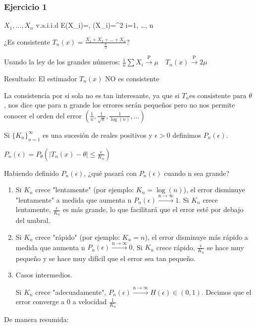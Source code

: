\documentclass{article}
\begin{document}
\subsubsection*{Ejercicio 1}
\(X_1, \dots, X_n \) v.a.i.i.d \quad E(X_i)=\mu, (X_i)=\sigma^2 \quad \forall i=1, \dots, n

¿Es consistente $T_n(x) = \frac{X_1 + X_2 + \dots + X_n}{\frac{n}{2}}$?

Usando la ley de los grandes números:
\(\frac{1}{n}\sum X_i \xrightarrow{\text{P}} \mu \quad T_n(x)\xrightarrow{\text{P}}2\mu\)

Resultado: El estimador \(T_n(x)\) NO es consistente

\newpage

La consistencia por si sola no es tan interesante, ya que si $T_n \text{es consistente para } \theta$, nos dice que para n grande los errores serán pequeños pero no nos permite conocer el orden del error $\left(\frac{1}{n}, \frac{1}{\sqrt{n}},\frac{1}{\log(n)}, \dots\right)$

Si $\{K_n\}_{n=1}^{\infty}$ es una sucesión de reales positivos y $\epsilon>0$ definimos $P_n(\epsilon)$.

\(P_n(\epsilon)=P_\theta(|T_n(x)-\theta| \leq \frac{\epsilon}{K_n})\)

Habiendo definido \(P_n(\epsilon)\), ¿qué pasará con  \(P_n(\epsilon)\) cuando n sea grande?
\begin{enumerate}
    \item Si \(K_n\) crece "lentamente" (por ejemplo:  \(K_n=\log(n)\)), el error disminuye "lentamente" a medida que aumenta n \(P_n(\epsilon) \xrightarrow{{\text{n} \to \infty}} 1\). Si \(K_n\) crece lentamente, \( \frac{\epsilon}{K_n}\) es más grande, lo que facilitará que el error esté por debajo del umbral.
    \item Si \(K_n\) crece "rápido" (por ejemplo:  \(K_n=n\)), el error disminuye más rápido a medida que aumenta n \(P_n(\epsilon) \xrightarrow{{\text{n} \to \infty}} 0\).  Si \(K_n\) crece rápido, \( \frac{\epsilon}{K_n}\) se hace muy pequeño y se hace muy difícil que el error sea tan pequeño.
    \item Casos intermedios.

          Si \(K_n\) crece "adecuadamente", \(P_n(\epsilon) \xrightarrow{{\text{n} \to \infty}} H(\epsilon) \in (0,1)\). Decimos que el error converge a 0 a velocidad \(\frac{1}{K_n}\)
\end{enumerate}
De manera resumida:
\end{document}
